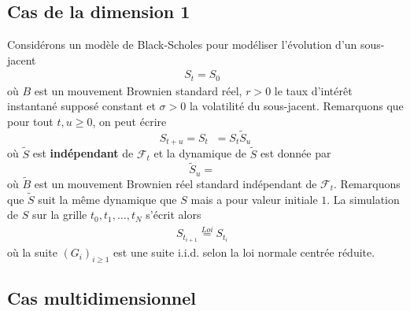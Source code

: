 \documentclass[a4paper,11pt]{article}
\def\cf{{\mathcal F}}
\def\expp#1{\mathop {\mathrm{e}^{ #1}}}
\begin{document}
\subsection{Cas de la dimension 1}
\label{bs1d}

Considérons un modèle de Black-Scholes pour modéliser l'évolution d'un sous-jacent
\begin{align*}
  S_t = S_0 \expp{(r - \sigma^2/2)t + \sigma B_t}
\end{align*}
où $B$ est un mouvement Brownien standard réel, $r>0$ le taux d'intérêt instantané supposé constant et $\sigma>0$ la volatilité du sous-jacent.  Remarquons que pour tout $t, u \ge 0$, on peut écrire
\begin{equation}
  \label{flot} S_{t+u} = S_{t} \expp{(r- \sigma^2/2) u + \sigma (B_{t+u} - B_t)}
  = S_t \tilde S_u
\end{equation}
où $\tilde S$ est {\bf indépendant} de $\cf_t$ et la dynamique de $\tilde S$ est donnée par
\begin{equation*}
  \tilde S_u = \expp{(r- \sigma^2/2) u + \sigma \tilde B_u}
\end{equation*}
où $\tilde B$ est un mouvement Brownien réel standard indépendant de $\cf_t$.  Remarquons que $\tilde S$ suit la même dynamique que $S$ mais a pour valeur initiale $1$.  La simulation de $S$ sur la grille $t_0, t_1, \dots, t_N$ s'écrit alors
\begin{align*}
  S_{t_{i+1}} \stackrel{Loi}{=} S_{t_i} \expp{(r - \sigma^2/2) (t_{i+1} - t_i) + \sigma
  \sqrt{t_{i+1} - t_i} G_{i+1}}
\end{align*}
où la suite $(G_i)_{i \ge 1}$ est une suite i.i.d. selon la loi normale centrée réduite.


\subsection{Cas multidimensionnel}
\label{bsnd}
\end{document}
